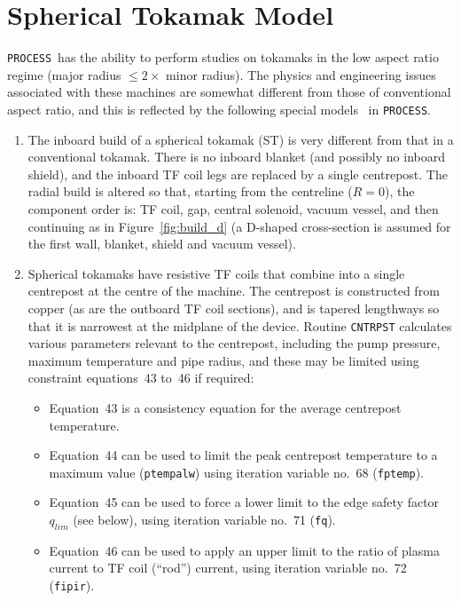 \documentclass[11pt,a4paper]{report}
\newcommand{\process}{\mbox{\texttt{PROCESS}}}
\begin{document}
\section{Spherical Tokamak Model}
\label{sec:tart}

\process\ has the ability to perform studies on tokamaks in the low aspect ratio
regime (major radius $\leq 2 \times$ minor radius). The physics and
engineering issues~\cite{tart} associated with these machines are somewhat
different from those of conventional aspect ratio, and this is reflected by
the following special models~\cite{storac} in \process.

\begin{enumerate}

\item The inboard build of a spherical tokamak (ST) is very different from
  that in a conventional tokamak. There is no inboard blanket (and possibly no
  inboard shield), and the inboard TF coil legs are replaced by a single
  centrepost. The radial build is altered so that, starting from the
  centreline ($R = 0$), the component order is: TF coil, gap, central
  solenoid, vacuum vessel, and then continuing as in Figure~\ref{fig:build_d}
  (a D-shaped cross-section is assumed for the first wall, blanket, shield and
  vacuum vessel).

\item Spherical tokamaks have resistive TF coils that combine into a single
  centrepost at the centre of the machine. The centrepost is constructed from
  copper (as are the outboard TF coil sections), and is tapered lengthways so
  that it is narrowest at the midplane of the device.  Routine
  \texttt{CNTRPST} calculates various parameters relevant to the centrepost,
  including the pump pressure, maximum temperature and pipe radius, and these
  may be limited using constraint equations~43 to~46 if required:

  \begin{itemize}
  \item Equation~43 is a consistency equation for the average centrepost
    temperature.
  \item Equation~44 can be used to limit the peak centrepost temperature to a
    maximum value (\texttt{ptempalw}) using iteration variable no.\ 68
    (\texttt{fptemp}).
  \item Equation~45 can be used to force a lower limit to the edge safety
    factor $q_{lim}$ (see below), using iteration variable no.\ 71 (\texttt{fq}).
  \item Equation~46 can be used to apply an upper limit to the ratio of plasma
    current to TF coil (``rod'') current, using iteration variable no.\ 72
    (\texttt{fipir}).
  \end{itemize}


\end{enumerate}
\end{document}
